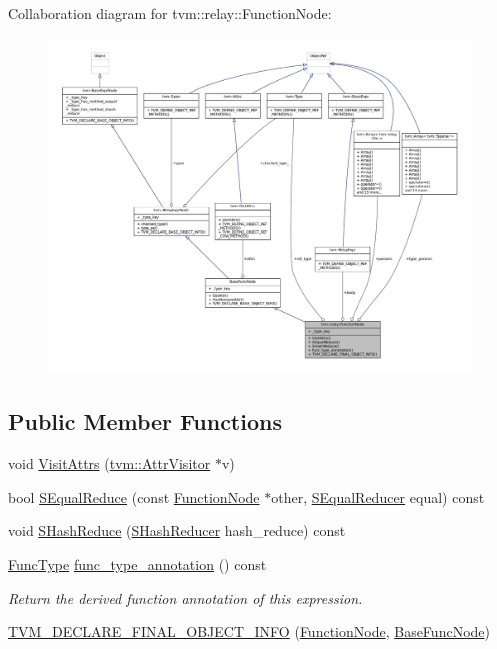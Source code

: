 Collaboration diagram for tvm\+:\+:relay\+:\+:Function\+Node\+:
\nopagebreak
\begin{figure}[H]
\begin{center}
\leavevmode
\includegraphics[width=350pt]{classtvm_1_1relay_1_1FunctionNode__coll__graph}
\end{center}
\end{figure}
\subsection*{Public Member Functions}
\begin{DoxyCompactItemize}
\item 
void \hyperlink{classtvm_1_1relay_1_1FunctionNode_a7f6fba6dde1c0edaa9989e018b8bbb4f}{Visit\+Attrs} (\hyperlink{classtvm_1_1AttrVisitor}{tvm\+::\+Attr\+Visitor} $\ast$v)
\item 
bool \hyperlink{classtvm_1_1relay_1_1FunctionNode_a8d54d444e9ea9fce2c485f52adce00bb}{S\+Equal\+Reduce} (const \hyperlink{classtvm_1_1relay_1_1FunctionNode}{Function\+Node} $\ast$other, \hyperlink{classtvm_1_1SEqualReducer}{S\+Equal\+Reducer} equal) const 
\item 
void \hyperlink{classtvm_1_1relay_1_1FunctionNode_afe0cf90285e42336eb9c1eebe793c276}{S\+Hash\+Reduce} (\hyperlink{classtvm_1_1SHashReducer}{S\+Hash\+Reducer} hash\+\_\+reduce) const 
\item 
\hyperlink{namespacetvm_1_1relay_aa475de90506d48a1bb04ef6d1bd99bfb}{Func\+Type} \hyperlink{classtvm_1_1relay_1_1FunctionNode_a758bc467aa4dc4041b0fc7b7dbca4e67}{func\+\_\+type\+\_\+annotation} () const 
\begin{DoxyCompactList}\small\item\em Return the derived function annotation of this expression. \end{DoxyCompactList}\item 
\hyperlink{classtvm_1_1relay_1_1FunctionNode_a303e82499e8931d3b63aea0ad29df5f2}{T\+V\+M\+\_\+\+D\+E\+C\+L\+A\+R\+E\+\_\+\+F\+I\+N\+A\+L\+\_\+\+O\+B\+J\+E\+C\+T\+\_\+\+I\+N\+FO} (\hyperlink{classtvm_1_1relay_1_1FunctionNode}{Function\+Node}, \hyperlink{namespacetvm_1_1relay_a4edf28d1226abc08d28bc2fd90ce7b42}{Base\+Func\+Node})
\end{DoxyCompactItemize}
